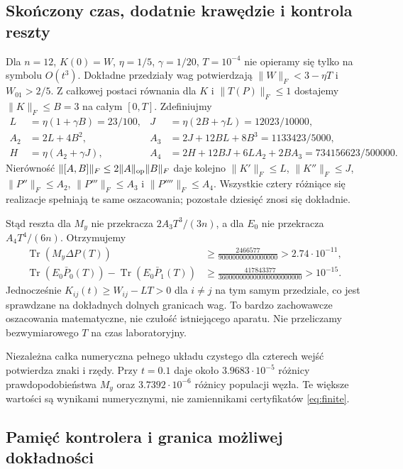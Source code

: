 \documentclass[11pt,a4paper]{article}
\newcommand{\Tr}{\operatorname{Tr}}
\begin{document}
\subsection{Skończony czas, dodatnie krawędzie i kontrola reszty}

Dla $n=12$, $K(0)=W$, $\eta=1/5$, $\gamma=1/20$, $T=10^{-4}$
nie opieramy się tylko na symbolu $O(t^3)$. Dokładne przedziały wag
potwierdzają $\|W\|_F<3-\eta T$ i $W_{01}>2/5$.
Z całkowej postaci równania dla $K$ i $\|T(P)\|_F\le1$ dostajemy
$\|K\|_F\le B=3$ na całym $[0,T]$. Zdefiniujmy
\begin{align}
 L&=\eta(1+\gamma B)=23/100,&
 J&=\eta(2B+\gamma L)=12023/10000,\\
 A_2&=2L+4B^2,&
 A_3&=2J+12BL+8B^3=1133423/5000,\\
 H&=\eta(A_2+\gamma J),&
 A_4&=2H+12BJ+6LA_2+2BA_3=734156623/500000.
\end{align}
Nierówność $\|[A,B]\|_F\le2\|A\|_{\rm op}\|B\|_F$ daje kolejno
$\|K'\|_F\le L$, $\|K''\|_F\le J$,
$\|P''\|_F\le A_2$, $\|P'''\|_F\le A_3$ i
$\|P''''\|_F\le A_4$. Wszystkie cztery różniące się realizacje
spełniają te same oszacowania; pozostałe dziesięć znosi się dokładnie.

Stąd reszta dla $M_y$ nie przekracza $2A_3T^3/(3n)$, a dla $E_0$
nie przekracza $A_4T^4/(6n)$. Otrzymujemy
\begin{align}\label{eq:finite}
 \Tr(M_y\Delta P(T))
 &\ge\frac{2466577}{90000000000000000}>2.74\cdot10^{-11},\\
 \Tr(E_0\bar P_0(T))-\Tr(E_0\bar P_1(T))
 &\ge\frac{417843377}{360000000000000000000000}>10^{-15}.
\end{align}
Jednocześnie $K_{ij}(t)\ge W_{ij}-LT>0$ dla $i\ne j$ na tym samym
przedziale, co jest sprawdzane na dokładnych dolnych granicach wag.
To bardzo zachowawcze oszacowania matematyczne, nie czułość istniejącego
aparatu. Nie przeliczamy bezwymiarowego $T$ na czas laboratoryjny.

Niezależna całka numeryczna pełnego układu czystego dla czterech wejść
potwierdza znaki i rzędy. Przy $t=0.1$ daje około
$3.9683\cdot10^{-5}$ różnicy prawdopodobieństwa $M_y$ oraz
$3.7392\cdot10^{-6}$ różnicy populacji węzła. Te większe wartości są
wynikami numerycznymi, nie zamiennikami certyfikatów \eqref{eq:finite}.

\subsection{Pamięć kontrolera i granica możliwej dokładności}
\end{document}
